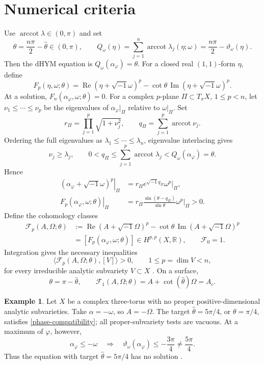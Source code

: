 \documentclass[12pt,reqno]{amsart}
\numberwithin{equation}{section}
\theoremstyle{plain}
\theoremstyle{definition}
\newtheorem{example}[theorem]{Example}
\newcommand{\cF}{\mathcal F}
\newcommand{\R}{\mathbb R}
\begin{document}
\section{Numerical criteria}\label{intersection-criteria}
Use $\operatorname{arccot}\lambda\in(0,\pi)$ and set
\begin{equation}\label{complementary-phase}
 \theta=\frac{n\pi}{2}-\widehat\theta\in(0,\pi),\qquad
 Q_\omega(\eta)=\sum_{j=1}^n\operatorname{arccot}\lambda_j(\eta;\omega)
 =\frac{n\pi}{2}-\vartheta_\omega(\eta).
\end{equation}
Then the dHYM equation is $Q_\omega(\alpha_\varphi)=\theta$. For a
closed real $(1,1)$-form $\eta$, define
\[
 F_p(\eta,\omega;\theta)
 =\operatorname{Re}(\eta+\sqrt{-1}\omega)^p
 -\cot\theta\,\operatorname{Im}(\eta+\sqrt{-1}\omega)^p.
\]
At a solution, $F_n(\alpha_\varphi,\omega;\theta)=0$.
For a complex $p$-plane $\Pi\subset T_xX$, $1\leq p<n$, let
$\nu_1\leq\cdots\leq\nu_p$ be the eigenvalues of
$\alpha_\varphi|_\Pi$ relative to $\omega|_\Pi$. Set
\[
 r_\Pi=\prod_{j=1}^p\sqrt{1+\nu_j^2},\qquad
 q_\Pi=\sum_{j=1}^p\operatorname{arccot}\nu_j.
\]
Ordering the full eigenvalues as $\lambda_1\leq\cdots\leq\lambda_n$,
eigenvalue interlacing gives
\[
 \nu_j\geq\lambda_j,\qquad
 0<q_\Pi\leq\sum_{j=1}^p\operatorname{arccot}\lambda_j
 <Q_\omega(\alpha_\varphi)=\theta.
\]
Hence
\begin{align*}
 \left.(\alpha_\varphi+\sqrt{-1}\omega)^p\right|_\Pi
 &=r_\Pi e^{\sqrt{-1}q_\Pi}\left.\omega^p\right|_\Pi,\\
 \left.F_p(\alpha_\varphi,\omega;\theta)\right|_\Pi
 &=r_\Pi\frac{\sin(\theta-q_\Pi)}{\sin\theta}
       \left.\omega^p\right|_\Pi>0.
\end{align*}
Define the cohomology classes
\begin{align}
 \cF_p(A,\Omega;\theta)
 &:=\operatorname{Re}(A+\sqrt{-1}\Omega)^p
       -\cot\theta\,\operatorname{Im}(A+\sqrt{-1}\Omega)^p\nonumber\\
 &=[F_p(\alpha_\varphi,\omega;\theta)]\in H^{p,p}(X,\R),
 \qquad \cF_0=1.
 \label{numerical-cohomology-class}
\end{align}
Integration gives the necessary inequalities
\[
 \langle\cF_p(A,\Omega;\theta),[V]\rangle>0,
 \qquad 1\leq p=\dim V<n,
\]
for every irreducible analytic subvariety $V\subset X$
\cite[Section 8]{CJY20}. On a surface,
\[
 \theta=\pi-\widehat\theta,\qquad
 \cF_1(A,\Omega;\theta)=A+\cot(\widehat\theta)\Omega=A_c.
\]

\begin{example}
\label{ex-torus-phase-lift}
Let $X$ be a complex three-torus with no proper positive-dimensional
analytic subvarieties. Take $\alpha=-\omega$, so $A=-\Omega$.
The target $\widehat\theta=5\pi/4$, or $\theta=\pi/4$, satisfies
\eqref{phase-compatibility}; all proper-subvariety tests are vacuous.
At a maximum of $\varphi$, however,
\[
 \alpha_\varphi\leq-\omega
 \quad\Longrightarrow\quad
 \vartheta_\omega(\alpha_\varphi)\leq-\frac{3\pi}{4}
 \neq\frac{5\pi}{4}.
\]
Thus the equation with target $\widehat\theta=5\pi/4$ has no solution
\cite{Zha23}.
\end{example}
\end{document}
